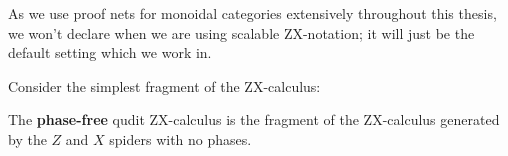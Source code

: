 As we use proof nets for monoidal categories extensively throughout this thesis, we won't declare when we are using scalable ZX-notation; it will just be the default setting which we work in.


Consider the simplest fragment of the ZX-calculus:
\begin{definition}
The {\bf phase-free} qudit ZX-calculus
is the fragment of the ZX-calculus generated by the $Z$ and $X$ spiders with no phases.
%
\end{definition}
